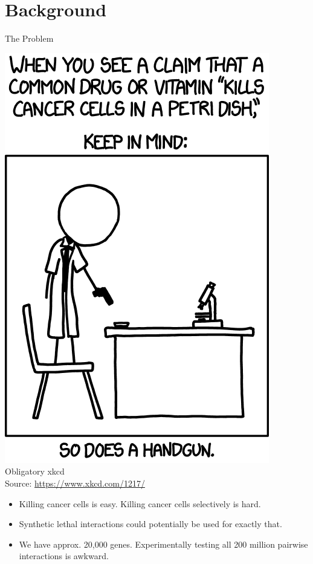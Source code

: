 \section{Background}
\begin{frame}{The Problem}
\begin{minipage}{0.4\linewidth}
	\includegraphics[width=0.8\linewidth]{"cells_2x"}\\[-1ex]
	{\tiny Obligatory xkcd\\Source: \href{https://www.xkcd.com/1217/}{https://www.xkcd.com/1217/}}
\end{minipage}%
\begin{minipage}{0.6\linewidth}
	\begin{itemize}
		\item Killing cancer cells is easy. Killing cancer cells selectively is hard.
		\item Synthetic lethal interactions could potentially be used for exactly that.\cite{Kaelin:2005gm}
		\item We have approx. 20,000 genes. Experimentally testing all 200 million pairwise interactions is awkward.
	\end{itemize}
\end{minipage}
\end{frame}


